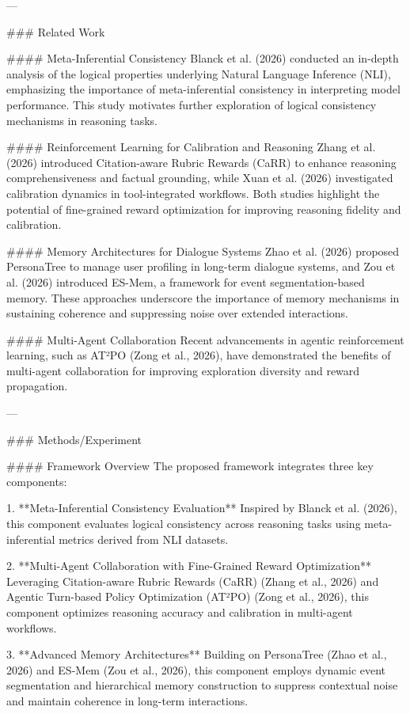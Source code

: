 ---

### Related Work  

#### Meta-Inferential Consistency  
Blanck et al. (2026) conducted an in-depth analysis of the logical properties underlying Natural Language Inference (NLI), emphasizing the importance of meta-inferential consistency in interpreting model performance. This study motivates further exploration of logical consistency mechanisms in reasoning tasks.  

#### Reinforcement Learning for Calibration and Reasoning  
Zhang et al. (2026) introduced Citation-aware Rubric Rewards (CaRR) to enhance reasoning comprehensiveness and factual grounding, while Xuan et al. (2026) investigated calibration dynamics in tool-integrated workflows. Both studies highlight the potential of fine-grained reward optimization for improving reasoning fidelity and calibration.  

#### Memory Architectures for Dialogue Systems  
Zhao et al. (2026) proposed PersonaTree to manage user profiling in long-term dialogue systems, and Zou et al. (2026) introduced ES-Mem, a framework for event segmentation-based memory. These approaches underscore the importance of memory mechanisms in sustaining coherence and suppressing noise over extended interactions.  

#### Multi-Agent Collaboration  
Recent advancements in agentic reinforcement learning, such as AT²PO (Zong et al., 2026), have demonstrated the benefits of multi-agent collaboration for improving exploration diversity and reward propagation.  

---

### Methods/Experiment  

#### Framework Overview  
The proposed framework integrates three key components:  

1. **Meta-Inferential Consistency Evaluation**  
   Inspired by Blanck et al. (2026), this component evaluates logical consistency across reasoning tasks using meta-inferential metrics derived from NLI datasets.  

2. **Multi-Agent Collaboration with Fine-Grained Reward Optimization**  
   Leveraging Citation-aware Rubric Rewards (CaRR) (Zhang et al., 2026) and Agentic Turn-based Policy Optimization (AT²PO) (Zong et al., 2026), this component optimizes reasoning accuracy and calibration in multi-agent workflows.  

3. **Advanced Memory Architectures**  
   Building on PersonaTree (Zhao et al., 2026) and ES-Mem (Zou et al., 2026), this component employs dynamic event segmentation and hierarchical memory construction to suppress contextual noise and maintain coherence in long-term interactions.  

